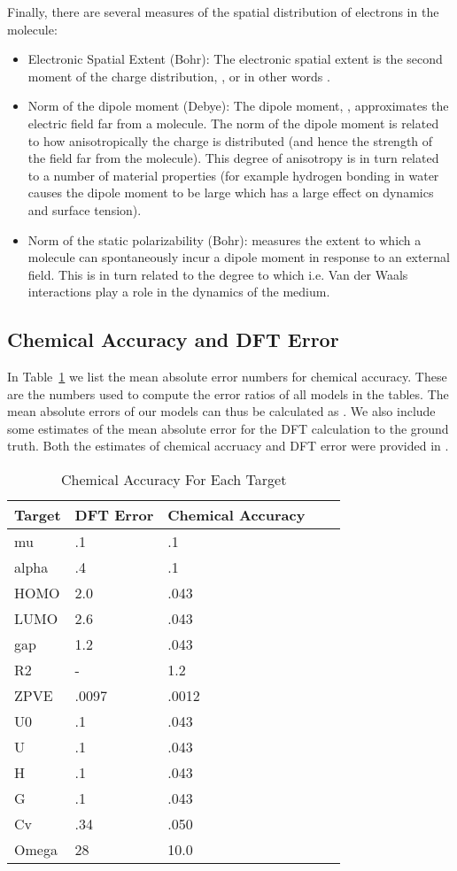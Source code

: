 \documentclass{article}
\begin{document}
Finally, there are several measures of the spatial distribution of electrons in the molecule:
\begin{itemize}
    \item Electronic Spatial Extent  (Bohr): The electronic spatial extent is the second moment of the charge distribution, , or in other words .
    \item Norm of the dipole moment  (Debye): The dipole moment, , approximates the electric field far from a molecule. The norm of the dipole moment is related to how anisotropically the charge is distributed (and hence the strength of the field far from the molecule). This degree of anisotropy is in turn related to a number of material properties (for example hydrogen bonding in water causes the dipole moment to be large which has a large effect on dynamics and surface tension).
    \item Norm of the static polarizability  (Bohr):  measures the extent to which a molecule can spontaneously incur a dipole moment in response to an external field. This is in turn related to the degree to which i.e. Van der Waals interactions play a role in the dynamics of the medium. 
\end{itemize}

\subsection{Chemical Accuracy and DFT Error}
    In Table~\ref{tb:chem_MAE} we list the mean absolute error numbers for chemical accuracy. These are the numbers used to compute the error ratios of all models in the tables. The mean absolute errors of our models can thus be calculated as . We also include some estimates of the mean absolute error for the DFT calculation to the ground truth. Both the estimates of chemical accruacy and DFT error were provided in \citet{colab}.

\begin{table}[t]
\centering
\caption{Chemical Accuracy For Each Target}
\label{tb:chem_MAE}
\begin{tabular}{lllll}
\hline
Target & DFT Error  & Chemical Accuracy \\
\hline


mu     & .1 & .1         \\
alpha  & .4 & .1           \\
HOMO   & 2.0 & .043          \\
LUMO   & 2.6 & .043       \\
gap    & 1.2 & .043        \\
R2     & - & 1.2         \\
ZPVE   & .0097 & .0012        \\
U0     & .1 & .043         \\
U      & .1 & .043           \\
H      & .1 &.043          \\
G      & .1 & .043      \\
Cv     & .34 & .050        \\
Omega  & 28 & 10.0          \\
\end{tabular}
\end{table}
\end{document}
